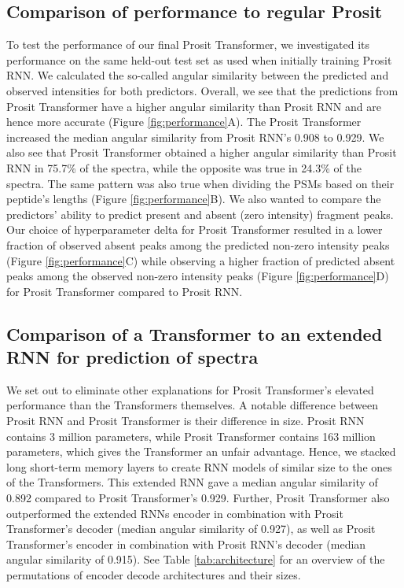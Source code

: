 \documentclass[10pt,a4paper]{article}
\begin{document}
\subsection*{Comparison of performance to regular Prosit}
    

To test the performance of our final Prosit Transformer, we investigated its performance on the same held-out test set as used when initially training Prosit RNN. We calculated the so-called angular similarity between the predicted and observed intensities for both predictors. Overall, we see that the predictions from Prosit Transformer have a higher angular similarity than Prosit RNN and are hence more accurate (Figure \ref{fig:performance}A). The Prosit Transformer increased the median angular similarity from Prosit RNN’s 0.908 to 0.929. We also see that Prosit Transformer obtained a higher angular similarity than Prosit RNN in 75.7\% of the spectra, while the opposite was true in 24.3\% of the spectra. The same pattern was also true when dividing the PSMs based on their peptide’s lengths (Figure \ref{fig:performance}B). We also wanted to compare the predictors’ ability to predict present and absent (zero intensity) fragment peaks.  Our choice of hyperparameter delta for Prosit Transformer resulted in a lower fraction of observed absent peaks among the predicted non-zero intensity peaks (Figure \ref{fig:performance}C) while observing a higher fraction of predicted absent peaks among the observed non-zero intensity peaks (Figure \ref{fig:performance}D) for Prosit Transformer compared to Prosit RNN.




\subsection*{Comparison of a Transformer to an extended RNN for prediction of spectra}

We set out to eliminate other explanations for Prosit Transformer's elevated performance than the Transformers themselves. A notable difference between Prosit RNN and Prosit Transformer is their difference in size. Prosit RNN contains 3 million parameters, while Prosit Transformer contains 163 million parameters, which gives the Transformer an unfair advantage. Hence, we stacked long short-term memory layers to create RNN models of similar size to the ones of the Transformers. This extended RNN gave a median angular similarity of 0.892 compared to Prosit Transformer's 0.929. Further, Prosit Transformer also outperformed the extended RNNs encoder in combination with Prosit Transformer’s decoder (median angular similarity of 0.927), as well as Prosit Transformer's encoder in combination with Prosit RNN's decoder (median angular similarity of 0.915). See Table \ref{tab:architecture} for an overview of the permutations of encoder decode architectures and their sizes.
\end{document}
